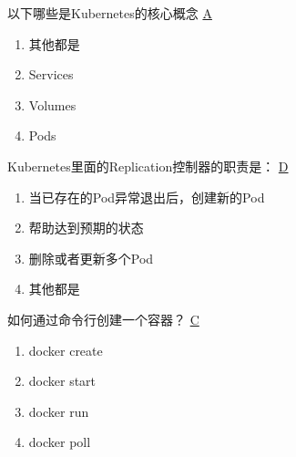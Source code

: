 \begin{problem}
	以下哪些是Kubernetes的核心概念
	\uline{A}    
    \vspace{-0.8em}
    \begin{multicols}{4}
        \begin{enumerate}[label=\Alph*.]
            \item 其他都是
            \item Services
            \item Volumes
            \item Pods
        \end{enumerate}
    \end{multicols}
    \vspace{-1em}
\end{problem}



\begin{problem}
    Kubernetes里面的Replication控制器的职责是：
	\uline{D}    
    \vspace{-0.8em}
    \begin{multicols}{2}
        \begin{enumerate}[label=\Alph*.]
            \item 当已存在的Pod异常退出后，创建新的Pod
            \item 帮助达到预期的状态
            \item 删除或者更新多个Pod
            \item 其他都是
        \end{enumerate}
    \end{multicols}
    \vspace{-1em}
\end{problem}



\begin{problem}
	如何通过命令行创建一个容器？
	\uline{C}    
    \vspace{-0.8em}
    \begin{multicols}{4}
        \begin{enumerate}[label=\Alph*.]
            \item docker create
            \item docker start
            \item docker run
            \item docker poll
        \end{enumerate}
    \end{multicols}
    \vspace{-1em}
\end{problem}



